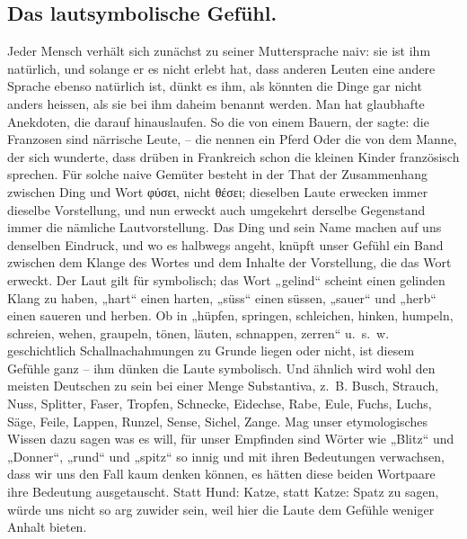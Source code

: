 {\subsection*{Das lautsymbolische Gefühl.}
Jeder Mensch verhält sich zunächst zu seiner Muttersprache naiv: sie ist ihm natürlich, und solange er es nicht erlebt hat, dass anderen Leuten eine andere Sprache ebenso natürlich ist, dünkt es ihm, als könnten die Dinge gar nicht anders heissen, als sie bei ihm daheim benannt werden. Man hat glaubhafte Anekdoten, die darauf hinauslaufen. So die von einem Bauern, der sagte:  die Franzosen sind närrische Leute, – die nennen ein Pferd  Oder die von dem Manne, der sich wunderte, dass drüben in Frankreich schon die kleinen Kinder französisch sprechen. Für solche naive Gemüter besteht in der That der Zusammenhang zwischen Ding und Wort φύσει, nicht θέσει; dieselben Laute erwecken immer dieselbe Vorstellung, und nun erweckt auch umgekehrt derselbe Gegenstand immer  die nämliche Lautvorstellung. Das Ding und sein Name machen auf uns denselben Eindruck, und wo es halbwegs angeht, knüpft unser Gefühl ein Band zwischen dem Klange des Wortes und dem Inhalte der Vorstellung, die das Wort erweckt. Der Laut gilt für symbolisch; \label{sp.219} das Wort „gelind“ scheint einen gelinden Klang zu haben, „hart“ einen harten, „süss“ einen süssen, „sauer“ und „herb“ einen saueren und herben. Ob in „hüpfen, springen, schleichen, hinken, humpeln, schreien, wehen, graupeln, tönen, läuten, schnappen, zerren“ u.~s.~w. geschichtlich Schallnachahmungen zu Grunde liegen oder nicht, ist diesem Gefühle ganz  – ihm dünken die Laute symbolisch. Und ähnlich wird wohl den meisten Deutschen zu  sein bei einer Menge Substantiva, z.~B. Busch, Strauch, Nuss, Splitter, Faser, Tropfen, Schnecke, Eidechse, Rabe, Eule, Fuchs, Luchs, Säge, Feile, Lappen, Runzel, Sense, Sichel, Zange. Mag unser etymologisches Wissen dazu sagen was es will, für unser Empfinden sind Wörter wie „Blitz“ und „Donner“, „rund“ und „spitz“ so innig und  mit ihren Bedeutungen verwachsen, dass wir uns den Fall kaum denken können, es hätten diese beiden Wortpaare ihre Bedeutung ausgetauscht. Statt Hund: Katze, statt Katze: Spatz zu sagen, würde uns nicht so arg zuwider sein, weil hier die Laute dem  Gefühle weniger Anhalt bieten.

}
